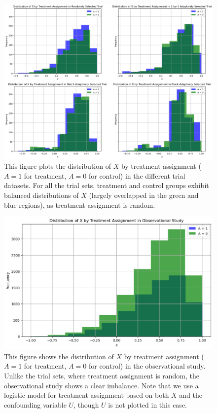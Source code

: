 \documentclass[12pt, oneside]{amsart}
\theoremstyle{definition}
\theoremstyle{remark}
\numberwithin{equation}{section}
\begin{document}
\begin{figure}[hbt!]
    \centering
    \includegraphics[scale=0.2]{Report/Figure/XinRCT.jpg}
    \caption{This figure plots the distribution of $X$ by treatment assignment ($A=1$ for treatment, $A=0$ for control) in the different trial datasets. For all the trial sets, treatment and control groups exhibit balanced distributions of $X$ (largely overlapped in the green and blue regions), as treatment assignment is random.}
    \label{XinRCT}
\end{figure}

\begin{figure}[hbt!]
    \centering
    \includegraphics[scale=0.25]{Report/Figure/XinOS.jpg}
    \caption{This figure shows the distribution of $X$ by treatment assignment ($A=1$ for treatment, $A=0$ for control) in the observational study. Unlike the trial sets, where treatment assignment is random, the observational study shows a clear imbalance. Note that we use a logistic model for treatment assignment based on both $X$ and the confounding variable $U$, though $U$ is not plotted in this case.}
    \label{XinOS}
\end{figure}
\FloatBarrier
\end{document}
